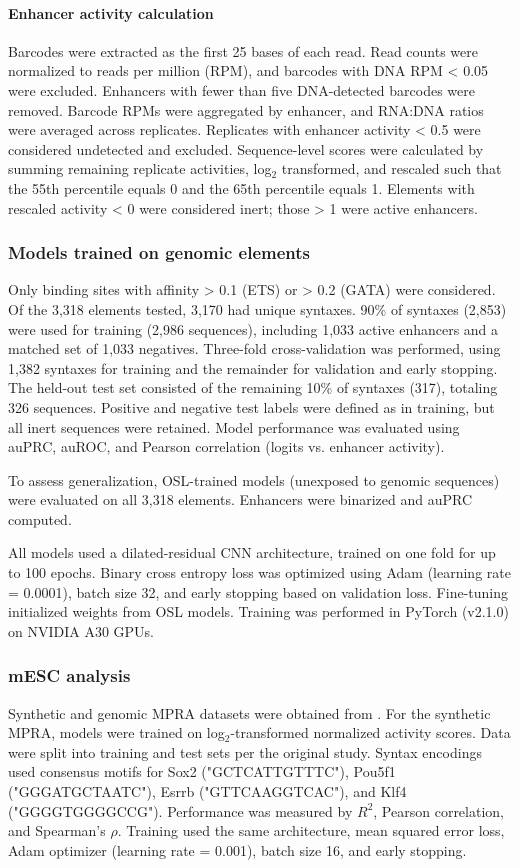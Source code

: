 \paragraph{Enhancer activity calculation}
Barcodes were extracted as the first 25 bases of each read. Read counts were normalized to reads per million (RPM), and barcodes with DNA RPM \textless{} 0.05 were excluded. Enhancers with fewer than five DNA-detected barcodes were removed. Barcode RPMs were aggregated by enhancer, and RNA:DNA ratios were averaged across replicates. Replicates with enhancer activity \textless{} 0.5 were considered undetected and excluded. Sequence-level scores were calculated by summing remaining replicate activities, log$_2$ transformed, and rescaled such that the 55th percentile equals 0 and the 65th percentile equals 1. Elements with rescaled activity \textless{} 0 were considered inert; those \textgreater{} 1 were active enhancers.

\subsubsection{Models trained on genomic elements}
Only binding sites with affinity \textgreater{} 0.1 (ETS) or \textgreater{} 0.2 (GATA) were considered. Of the 3,318 elements tested, 3,170 had unique syntaxes. 90\% of syntaxes (2,853) were used for training (2,986 sequences), including 1,033 active enhancers and a matched set of 1,033 negatives. Three-fold cross-validation was performed, using 1,382 syntaxes for training and the remainder for validation and early stopping. The held-out test set consisted of the remaining 10\% of syntaxes (317), totaling 326 sequences. Positive and negative test labels were defined as in training, but all inert sequences were retained. Model performance was evaluated using auPRC, auROC, and Pearson correlation (logits vs. enhancer activity).

To assess generalization, OSL-trained models (unexposed to genomic sequences) were evaluated on all 3,318 elements. Enhancers were binarized and auPRC computed.

All models used a dilated-residual CNN architecture, trained on one fold for up to 100 epochs. Binary cross entropy loss was optimized using Adam\cite{Kingma2014-kn} (learning rate = 0.0001), batch size 32, and early stopping based on validation loss. Fine-tuning initialized weights from OSL models. Training was performed in PyTorch (v2.1.0) on NVIDIA A30 GPUs.

\subsubsection{mESC analysis}
Synthetic and genomic MPRA datasets were obtained from \cite{King2020-hk}. For the synthetic MPRA, models were trained on log$_2$-transformed normalized activity scores. Data were split into training and test sets per the original study. Syntax encodings used consensus motifs for Sox2 ("GCTCATTGTTTC"), Pou5f1 ("GGGATGCTAATC"), Esrrb ("GTTCAAGGTCAC"), and Klf4 ("GGGGTGGGGCCG"). Performance was measured by \(R^2\), Pearson correlation, and Spearman's \(\rho\). Training used the same architecture, mean squared error loss, Adam optimizer (learning rate = 0.001), batch size 16, and early stopping.

